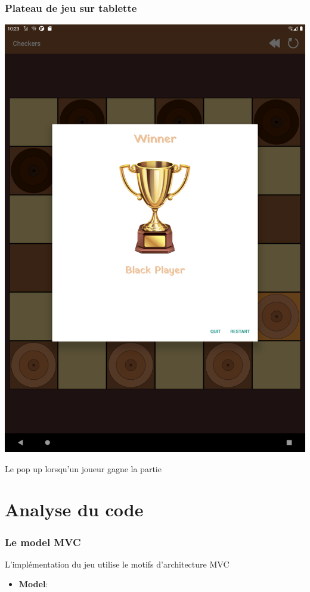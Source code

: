 \documentclass{beamer}
\begin{document}
\begin{frame}
  \frametitle{Plateau de jeu sur tablette}
  \begin{center}
    \includegraphics[scale=0.06]{pop_up_victoire_tablet.png}
  \end{center}
  
  \begin{center}
    Le pop up lorsqu'un joueur gagne la partie
  \end{center}
\end{frame}


%
%
\section{Analyse du code}
%
%
\begin{frame}
  \frametitle{Le model MVC}

  L'implémentation du jeu utilise le motifs d'architecture MVC

  \begin{itemize}
    \item \textbf{Model}: \color{blue}
  \end{itemize}

\end{frame}
\end{document}
